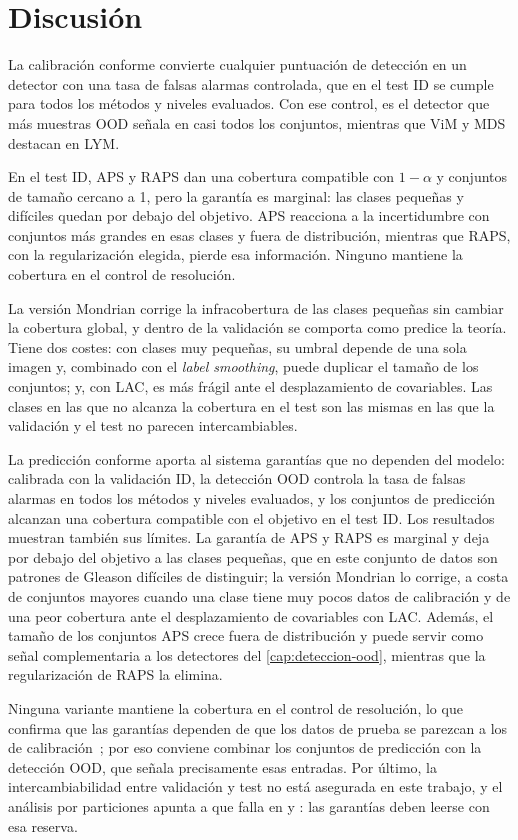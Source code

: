 \section{Discusión}\label{sec:conforme-discusion}

La calibración conforme convierte cualquier
puntuación de detección en un detector con una tasa de falsas alarmas controlada,
que en el test ID se cumple para todos los métodos y niveles evaluados. Con ese
control, \stoodx es el detector que más muestras OOD señala en casi todos los
conjuntos, mientras que ViM y MDS destacan en LYM.

En el test ID, APS y RAPS dan una cobertura
compatible con $1-\alpha$ y conjuntos de tamaño cercano a 1, pero la garantía es
marginal: las clases pequeñas y difíciles quedan por debajo del objetivo. APS
reacciona a la incertidumbre con conjuntos más grandes en esas clases y fuera de
distribución, mientras que RAPS, con la regularización elegida, pierde esa
información. Ninguno mantiene la cobertura en el control de resolución.

La versión Mondrian corrige la infracobertura de
las clases pequeñas sin cambiar la cobertura global, y dentro de la validación se
comporta como predice la teoría. Tiene dos costes: con clases muy pequeñas, su
umbral depende de una sola imagen y, combinado con el \emph{label smoothing},
puede duplicar el tamaño de los conjuntos; y, con LAC, es más frágil ante el
desplazamiento de covariables. Las clases en las que no alcanza la cobertura en el
test son las mismas en las que la validación y el test no parecen
intercambiables.

La predicción conforme aporta al sistema garantías que no dependen del modelo:
calibrada con la validación ID, la detección OOD controla la tasa de falsas alarmas
en todos los métodos y niveles evaluados, y los conjuntos de predicción alcanzan
una cobertura compatible con el objetivo en el test ID. Los resultados muestran
también sus límites. La garantía de APS y RAPS es marginal y deja por debajo del
objetivo a las clases pequeñas, que en este conjunto de datos son patrones de
Gleason difíciles de distinguir; la versión Mondrian lo corrige, a costa de
conjuntos mayores cuando una clase tiene muy pocos datos de calibración y de una
peor cobertura ante el desplazamiento de covariables con LAC. Además, el tamaño de
los conjuntos APS crece fuera de distribución y puede servir como señal
complementaria a los detectores del \cref{cap:deteccion-ood}, mientras que la
regularización de RAPS la elimina.

Ninguna variante mantiene la cobertura en el control de resolución, lo que
confirma que las garantías dependen de que los datos de prueba se parezcan a los
de calibración~\cite{angelopoulos2021}; por eso conviene combinar los conjuntos de
predicción con la detección OOD, que señala precisamente esas entradas. Por
último, la intercambiabilidad entre validación y test no está asegurada en este
trabajo, y el análisis por particiones apunta a que falla en
 y : las garantías deben
leerse con esa reserva.

\endinput
